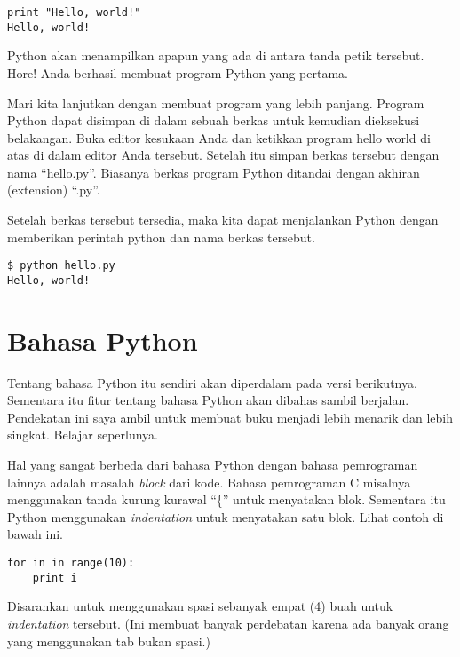 \begin{verbatim}
print "Hello, world!"
Hello, world!
\end{verbatim}

Python akan menampilkan apapun yang ada di antara tanda petik tersebut. Hore!
Anda berhasil membuat program Python yang pertama.

Mari kita lanjutkan dengan membuat program yang lebih panjang. Program Python
dapat disimpan di dalam sebuah berkas untuk kemudian dieksekusi belakangan.
Buka editor kesukaan Anda dan ketikkan program hello world di atas di dalam
editor Anda tersebut. Setelah itu simpan berkas tersebut dengan nama
``hello.py''. Biasanya berkas program Python ditandai dengan akhiran
(extension) ``.py''.

Setelah berkas tersebut tersedia, maka kita dapat menjalankan Python dengan
memberikan perintah python dan nama berkas tersebut.

\begin{verbatim}
$ python hello.py
Hello, world!
\end{verbatim}

\section{Bahasa Python} 
Tentang bahasa Python itu sendiri akan diperdalam pada versi berikutnya.
Sementara itu fitur tentang bahasa Python akan dibahas sambil berjalan.
Pendekatan ini saya ambil untuk membuat buku menjadi lebih menarik dan lebih
singkat. Belajar seperlunya.

Hal yang sangat berbeda dari bahasa Python dengan
bahasa pemrograman lainnya adalah masalah {\em block} dari kode. Bahasa pemrograman C misalnya menggunakan tanda kurung kurawal ``\{'' untuk menyatakan blok. Sementara itu Python menggunakan {\em indentation} untuk menyatakan satu blok. Lihat contoh di bawah ini.

\begin{verbatim}
for in in range(10):
    print i
\end{verbatim}

Disarankan untuk menggunakan spasi sebanyak empat (4) buah untuk {\em
indentation} tersebut. (Ini membuat banyak perdebatan karena ada banyak orang
yang menggunakan tab bukan spasi.)
